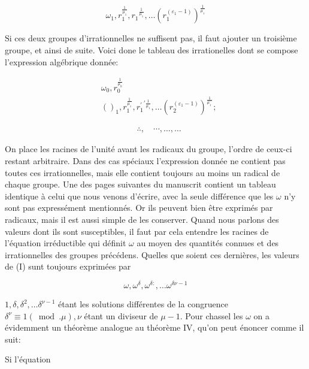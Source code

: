 \documentclass{article}
\begin{document}
\[
\omega_{1}, r_{1}^{\frac{1}{\mu_{1}}}, r_{1}{ }^{\frac{1}{\mu_{1}}}, \ldots\left(r_{1}^{\left(\varepsilon_{1}-1\right)}\right)^{\frac{1}{\mu_{1}}}
\]

\(\mathrm{Si}\) ces deux groupes d'irrationnelles ne suffisent pas, il faut ajouter un troisième groupe, et ainsi de suite. Voici done le tableau des irrationelles dont se compose l'expression algébrique donnée:

\[
\begin{aligned}
& \omega_{0}, r_{0}^{\frac{1}{\mu_{0}}} \\
& ()_{1}, r_{1}^{\frac{1}{\mu_{1}}}, r_{1}^{\prime}{ }^{\prime \frac{1}{\mu_{1}}}, \ldots\left(r_{2}^{\left(\varepsilon_{1}-1\right)}\right)^{\frac{1}{\mu_{1}^{-}}} ;
\end{aligned}
\]


\[
\begin{aligned}
& \therefore, \quad \cdots, \ldots, \ldots
\end{aligned}
\]

On place les racines de l'unité avant les radicaux du groupe, l'ordre de ceux-ci restant arbitraire. Dans des cas spéciaux l'expression donnée ne contient pas toutes ces irrationnelles, mais elle contient toujours au moins un radical de chaque groupe. Une des pages suivantes du manuscrit contient un tableau identique à celui que nous venons d'écrire, avec la seule différence que les \(\omega\) n'y sont pas expressément mentionnés. Or ils peuvent bien être exprimés par radicaux, mais il est aussi simple de les conserver. Quand nous parlons des valeurs dont ils sont susceptibles, il faut par cela entendre les racines de l'équation irréductible qui définit \(\omega\) au moyen des quantités connues et des irrationnelles des groupes précédens. Quelles que soient ces dernières, les valeurs de (I) sunt toujours exprimées par

\[
\omega, \omega^{\delta}, \omega^{\delta:}, \ldots \omega^{\delta \nu-1}
\]

\(1, \delta, \delta^{2}, \ldots \delta^{\nu-1}\) étant les solutions différentes de la congruence \(\delta^{\nu} \equiv 1(\bmod . \mu), \nu\) étant un diviseur de \(\mu-1\). Pour chassel les \(\omega\) on a évidemment un théorème analogue au théorème IV, qu'on peut énoncer comme il suit:

Si l'équation
\end{document}
